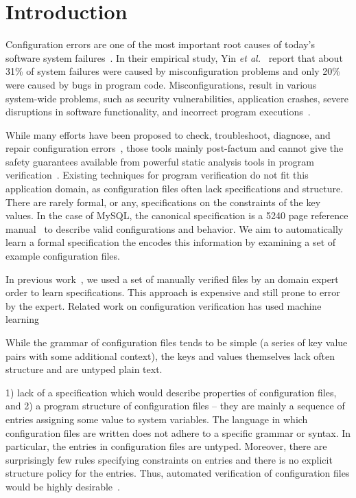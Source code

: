\section{Introduction}
\label{sec-intro}

Configuration errors are one of the most important root causes of today's software system failures~\cite{xu15systems, yin11anempirical}.
In their empirical study, Yin {\em et al.}~\cite{yin11anempirical} report that about 31\% of system failures were caused by misconfiguration problems and only 20\% were caused by bugs in program code. 
Misconfigurations, result in various system-wide problems, such as security vulnerabilities, application crashes, severe disruptions in software functionality, and incorrect program executions~\cite{zhang14encore, yuan11context, xu13do, xu15hey}.  

While many efforts have been proposed to check, troubleshoot, diagnose, and repair configuration errors~\cite{attariyan10automating,su07autobash, whitaker04configuration},
  those tools mainly post-factum and cannot give the safety guarantees available from powerful static analysis tools in program verification~\cite{Leino10Dafny, PiskacWZ14, BobotFMP15}.
Existing techniques for program verification do not fit this application domain, as configuration files often lack specifications and structure.
There are rarely formal, or any, specifications on the constraints of the key values.
In the case of MySQL, the canonical specification is a 5240 page reference manual~\cite{mysql-manual15} to describe valid configurations and behavior.
We aim to automatically learn a formal specification the encodes this information by examining a set of example configuration files.

In previous work~\cite{santolucitoCAV}, we used a set of manually verified files by an domain expert order to learn specifications.
This approach is expensive and still prone to error by the expert.
Related work on configuration verification has used machine learning

While the grammar of configuration files tends to be simple (a series of key value pairs with some additional context), the keys and values themselves lack often structure and are untyped plain text.

   1) lack of a specification which would describe properties of configuration files, and 
   2) a program structure of configuration files -- they are mainly a sequence of entries assigning some value to system variables. 
The language in which configuration files are written does not adhere to a specific grammar or syntax. 
In particular, the entries in configuration files are untyped. 
Moreover, there are surprisingly few rules specifying constraints on entries and there is no explicit structure policy for the entries.
Thus, automated verification of configuration files would be highly desirable~\cite{wang04automatic, zhang14encore, xu15systems}.

